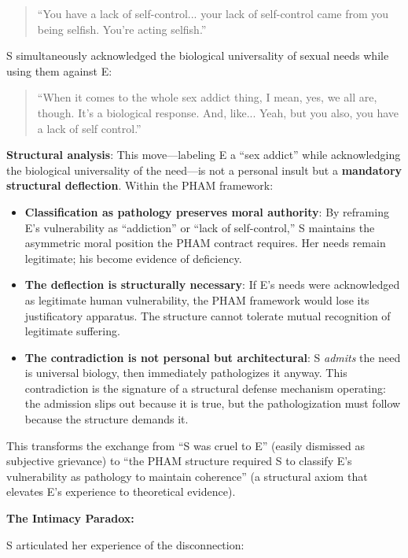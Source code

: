 \documentclass[12pt, letterpaper]{article}
\begin{document}
\begin{quote}
``You have a lack of self-control... your lack of self-control came from you being selfish. You're acting selfish.''
\end{quote}

S simultaneously acknowledged the biological universality of sexual needs while using them against E:

\begin{quote}
``When it comes to the whole sex addict thing, I mean, yes, we all are, though. It's a biological response. And, like... Yeah, but you also, you have a lack of self control.''
\end{quote}

\textbf{Structural analysis}: This move---labeling E a ``sex addict'' while acknowledging the biological universality of the need---is not a personal insult but a \textbf{mandatory structural deflection}. Within the PHAM framework:

\begin{itemize}
    \item \textbf{Classification as pathology preserves moral authority}: By reframing E's vulnerability as ``addiction'' or ``lack of self-control,'' S maintains the asymmetric moral position the PHAM contract requires. Her needs remain legitimate; his become evidence of deficiency.
    \item \textbf{The deflection is structurally necessary}: If E's needs were acknowledged as legitimate human vulnerability, the PHAM framework would lose its justificatory apparatus. The structure cannot tolerate mutual recognition of legitimate suffering.
    \item \textbf{The contradiction is not personal but architectural}: S \textit{admits} the need is universal biology, then immediately pathologizes it anyway. This contradiction is the signature of a structural defense mechanism operating: the admission slips out because it is true, but the pathologization must follow because the structure demands it.
\end{itemize}

This transforms the exchange from ``S was cruel to E'' (easily dismissed as subjective grievance) to ``the PHAM structure required S to classify E's vulnerability as pathology to maintain coherence'' (a structural axiom that elevates E's experience to theoretical evidence).

\textbf{The Intimacy Paradox:}

S articulated her experience of the disconnection:
\end{document}
